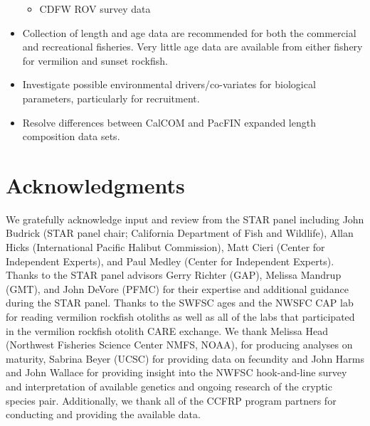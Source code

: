 \documentclass[11pt,
  english,
]{article}
\begin{document}
\begin{itemize}
\begin{itemize}
    \tagmcend\tagstructend\tagstructend

    \tagmcend\tagstructend\tagstructend
  \item


    CDFW ROV survey data

    \tagmcend\tagstructend\tagstructend

    \tagmcend\tagstructend\tagstructend
  \end{itemize}

  \tagstructend
\item
  Collection of length and age data are recommended for both the commercial and recreational fisheries. Very little age data are available from either fishery for vermilion and sunset rockfish.
\item
  Investigate possible environmental drivers/co-variates for biological parameters, particularly for recruitment.
\item
  Resolve differences between CalCOM and PacFIN expanded length composition data sets.
\end{itemize}

\tagstructend

\clearpage


\hypertarget{acknowledgments}{%
\section*{Acknowledgments}\label{acknowledgments}}

\leavevmode\tagmcend\tagstructend

We gratefully acknowledge input and review from the STAR panel including John Budrick (STAR panel chair; California Department of Fish and Wildlife), Allan Hicks (International Pacific Halibut Commission), Matt Cieri (Center for Independent Experts), and Paul Medley (Center for Independent Experts). Thanks to the STAR panel advisors Gerry Richter (GAP), Melissa Mandrup (GMT), and John DeVore (PFMC) for their expertise and additional guidance during the STAR panel. Thanks to the SWFSC ages and the NWSFC CAP lab for reading vermilion rockfish otoliths as well as all of the labs that participated in the vermilion rockfish otolith CARE exchange. We thank Melissa Head (Northwest Fisheries Science Center NMFS, NOAA), for producing analyses on maturity, Sabrina Beyer (UCSC) for providing data on fecundity and John Harms and John Wallace for providing insight into the NWFSC hook-and-line survey and interpretation of available genetics and ongoing research of the cryptic species pair. Additionally, we thank all of the CCFRP program partners for conducting and providing the available data.
\end{document}

